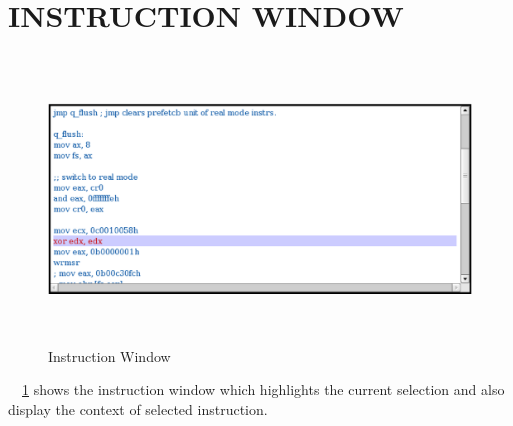 \section {INSTRUCTION WINDOW}
\begin{figure}[H]
\centering
\includegraphics[width=5in, height=3in]{./figures/gui_asm.eps}
\caption{Instruction Window}
\label{fig:gui_asm.eps}
\end{figure}
~\figurename{~\ref{fig:gui_asm.eps}} shows the instruction window which highlights the current selection and also display the context of selected instruction.




































